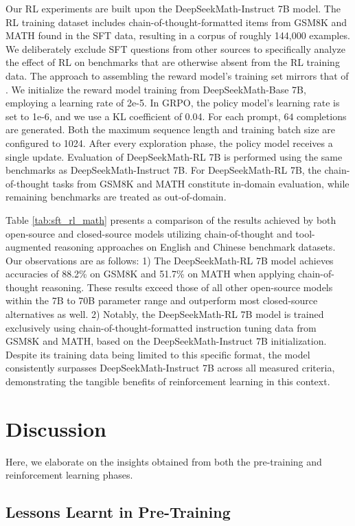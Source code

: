 {Our RL experiments are built upon the DeepSeekMath-Instruct 7B model. The RL training dataset includes chain-of-thought-formatted items from GSM8K and MATH found in the SFT data, resulting in a corpus of roughly 144,000 examples. We deliberately exclude SFT questions from other sources to specifically analyze the effect of RL on benchmarks that are otherwise absent from the RL training data. The approach to assembling the reward model's training set mirrors that of \citep{wang2023math}. We initialize the reward model training from DeepSeekMath-Base 7B, employing a learning rate of 2e-5. In GRPO, the policy model’s learning rate is set to 1e-6, and we use a KL coefficient of 0.04. For each prompt, $64$ completions are generated. Both the maximum sequence length and training batch size are configured to 1024. After every exploration phase, the policy model receives a single update. Evaluation of DeepSeekMath-RL 7B is performed using the same benchmarks as DeepSeekMath-Instruct 7B. For DeepSeekMath-RL 7B, the chain-of-thought tasks from GSM8K and MATH constitute in-domain evaluation, while remaining benchmarks are treated as out-of-domain.

Table \ref{tab:sft_rl_math} presents a comparison of the results achieved by both open-source and closed-source models utilizing chain-of-thought and tool-augmented reasoning approaches on English and Chinese benchmark datasets. Our observations are as follows: 1) The DeepSeekMath-RL 7B model achieves accuracies of 88.2\% on GSM8K and 51.7\% on MATH when applying chain-of-thought reasoning. These results exceed those of all other open-source models within the 7B to 70B parameter range and outperform most closed-source alternatives as well. 2) Notably, the DeepSeekMath-RL 7B model is trained exclusively using chain-of-thought-formatted instruction tuning data from GSM8K and MATH, based on the DeepSeekMath-Instruct 7B initialization. Despite its training data being limited to this specific format, the model consistently surpasses DeepSeekMath-Instruct 7B across all measured criteria, demonstrating the tangible benefits of reinforcement learning in this context.

\section{Discussion}
Here, we elaborate on the insights obtained from both the pre-training and reinforcement learning phases.

\subsection{Lessons Learnt in Pre-Training}

}

